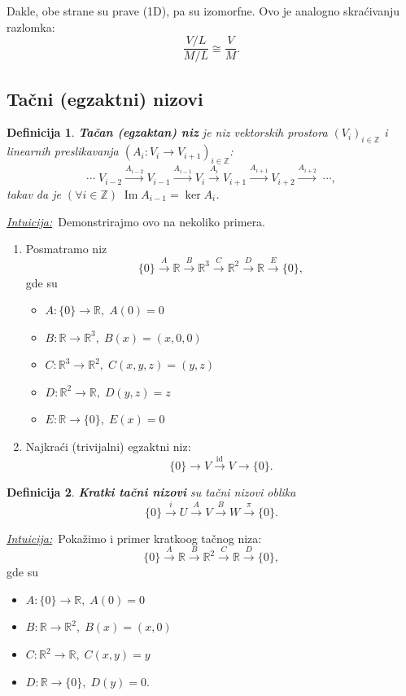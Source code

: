 \documentclass[a4paper,12pt,twoside]{report}
\newtheorem{definition}{Definicija}[section]
\numberwithin{algorithm}{section}
\newcommand{\intuicija}{\noindent\underline{\textit{Intuicija:}}\ }
\begin{document}
Dakle, obe strane su prave (1D), pa su izomorfne. Ovo je analogno skraćivanju razlomka: 
\[
\frac{V/L}{M/L} \cong \frac{V}{M}.
\]

\subsection{Tačni (egzaktni) nizovi}

\begin{definition}
    \textbf{Tačan (egzaktan) niz} je niz vektorskih prostora $(V_i)_{i \in \mathbb{Z}}$ i linearnih preslikavanja $(A_i: V_i \to V_{i+1})_{i \in \mathbb{Z}}$:
    \[ \cdots \;V_{i-2} \xrightarrow{A_{i-2}} V_{i-1} \xrightarrow{A_{i-1}} V_i \xrightarrow{A_i} V_{i+1} \xrightarrow{A_{i+1}} V_{i+2} \xrightarrow{A_{i+2}} \;\cdots,  \]
    takav da je $(\forall i \in \mathbb{Z})\;\operatorname{Im} A_{i-1} = \ker A_i$.
\end{definition}

\intuicija Demonstrirajmo ovo na nekoliko primera.
\begin{enumerate}
    \item Posmatramo niz 
    \[ \{0\} \xrightarrow{A} \mathbb{R} \xrightarrow{B} \mathbb{R}^3 \xrightarrow{C} \mathbb{R}^2 \xrightarrow{D} \mathbb{R} \xrightarrow{E} \{0\}, \]
    gde su
    \begin{itemize}
        \item $A: \{0\} \to \mathbb{R}, \;A(0) = 0$
        \item $B: \mathbb{R} \to \mathbb{R}^3, \; B(x) = (x, 0, 0)$
        \item $C: \mathbb{R}^3 \to \mathbb{R}^2, \; C(x, y, z) = (y, z)$
        \item $D: \mathbb{R}^2 \to \mathbb{R}, \; D(y, z) = z$
        \item $E: \mathbb{R} \to \{0\}, \; E(x) = 0$
    \end{itemize}
    \item Najkraći (trivijalni) egzaktni niz:
    \[ \{0\} \to V \xrightarrow{\operatorname{id}} V \to \{0\}. \]
\end{enumerate}

\begin{definition}
    \textbf{Kratki tačni nizovi} su tačni nizovi oblika 
    \[ \{0\} \xrightarrow{i} U \xrightarrow{A} V \xrightarrow{B} W \xrightarrow{\pi} \{0\}. \]
\end{definition}
\intuicija Pokažimo i primer kratkoog tačnog niza:
\[ \{0\} \xrightarrow{A} \mathbb{R} \xrightarrow{B} \mathbb{R}^2 \xrightarrow{C} \mathbb{R} \xrightarrow{D} \{0\}, \]
gde su
\begin{itemize}
    \item $A: \{0\} \to \mathbb{R}, \; A(0) = 0$
    \item $B: \mathbb{R} \to \mathbb{R}^2, \; B(x) = (x, 0)$
    \item $C: \mathbb{R}^2 \to \mathbb{R}, \; C(x, y) = y$
    \item $D: \mathbb{R} \to \{0\}, \; D(y) = 0$.
\end{itemize}
\end{document}
